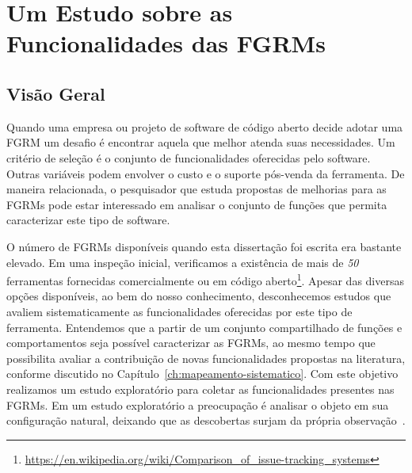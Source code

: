 
\section{Um Estudo sobre as Funcionalidades das FGRMs}
\label{sec:caracterizacao_ferramentas}

\subsection{Visão Geral}
\label{subsec:caracterizacao_intro}

Quando uma empresa ou projeto de software de código aberto decide adotar uma
FGRM um desafio é encontrar aquela que melhor atenda suas necessidades.  Um
critério de seleção é o conjunto de funcionalidades oferecidas pelo software.
Outras variáveis podem envolver o custo e o suporte pós-venda da ferramenta. De
maneira relacionada, o pesquisador que estuda propostas de melhorias para as
FGRMs pode estar interessado em analisar o conjunto de funções que permita
caracterizar este tipo de software.

O número de FGRMs disponíveis quando esta dissertação foi escrita era bastante
elevado. Em uma inspeção inicial, verificamos a existência de mais de
\textit{50} ferramentas fornecidas comercialmente ou em código
aberto\footnote{\url{https://en.wikipedia.org/wiki/Comparison_of_issue-tracking_systems}}.
Apesar das diversas opções disponíveis, ao bem do nosso conhecimento,
desconhecemos estudos que avaliem sistematicamente as funcionalidades oferecidas
por este tipo de ferramenta. Entendemos que a partir de um conjunto
compartilhado de funções e comportamentos seja possível caracterizar as FGRMs,
ao mesmo tempo que possibilita avaliar a contribuição de novas funcionalidades
propostas na li\-te\-ra\-tu\-ra, conforme discutido no
Capítulo~\ref{ch:mapeamento-sistematico}. Com este objetivo realizamos um estudo
exploratório para coletar as funcionalidades presentes nas FGRMs. Em um estudo
exploratório a preocupação é analisar o objeto em sua configuração natural,
deixando que as descobertas surjam da própria
observação~\cite{wohlin2012experimentation}.

